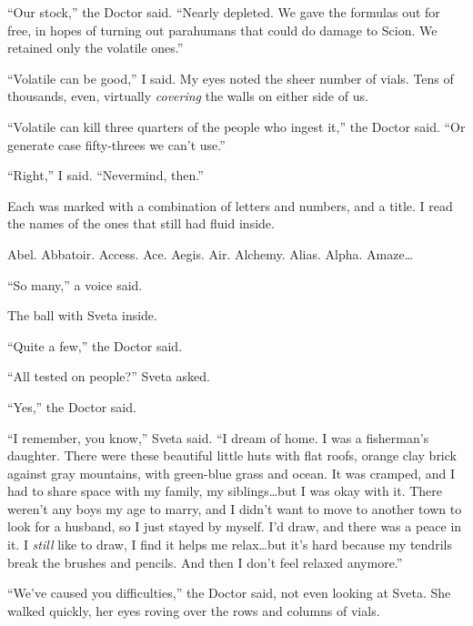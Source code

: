 ``Our stock,'' the Doctor said.  ``Nearly depleted.  We gave the formulas out for free, in hopes of turning out parahumans that could do damage to Scion.  We retained only the volatile ones.''



``Volatile can be good,'' I said.  My eyes noted the sheer number of vials.  Tens of thousands, even, virtually \emph{covering} the walls on either side of us.



``Volatile can kill three quarters of the people who ingest it,'' the Doctor said.  ``Or generate case fifty-threes we can't use.''



``Right,'' I said.  ``Nevermind, then.''



Each was marked with a combination of letters and numbers, and a title.  I read the names of the ones that still had fluid inside.



Abel.  Abbatoir.  Access.  Ace.  Aegis.  Air.  Alchemy.  Alias.  Alpha.  Amaze\ldots



``So many,'' a voice said.



The ball with Sveta inside.



``Quite a few,'' the Doctor said.



``All tested on people?''  Sveta asked.



``Yes,'' the Doctor said.



``I remember, you know,'' Sveta said.  ``I dream of home.  I was a fisherman's daughter.  There were these beautiful little huts with flat roofs, orange clay brick against gray mountains, with green-blue grass and ocean.  It was cramped, and I had to share space with my family, my siblings\ldots but I was okay with it.  There weren't any boys my age to marry, and I didn't want to move to another town to look for a husband, so I just stayed by myself.  I'd draw, and there was a peace in it.  I \emph{still} like to draw, I find it helps me relax\ldots but it's hard because my tendrils break the brushes and pencils.  And then I don't feel relaxed anymore.''



``We've caused you difficulties,'' the Doctor said, not even looking at Sveta.  She walked quickly, her eyes roving over the rows and columns of vials.



